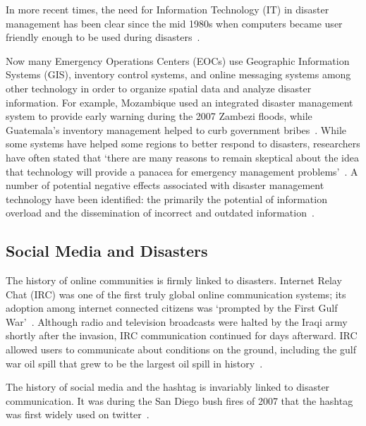 In more recent times, the need for Information Technology (IT) in disaster
management has been clear since the mid 1980s when computers became user
friendly enough to be used during
disasters~\cite{universityTerminalDisastersComputer1986}.

Now many Emergency Operations Centers (EOCs) use Geographic Information Systems
(GIS), inventory control systems, and online messaging systems among other
technology in order to organize spatial data and analyze disaster information.
For example, Mozambique used an integrated disaster management system to provide
early warning during the 2007  Zambezi floods, while Guatemala's inventory
management helped to curb government bribes~\cite{aminDataNaturalDisasters2008}.
While some systems have helped some regions to better respond to disasters,
researchers have often stated that `there are many reasons to remain skeptical
about the idea that technology will provide a panacea for emergency management
problems'~\cite{tzemosUseGISFederal1995, tierneyFacingUnexpectedDisaster2001,
perryNaturalDisasterManagement2007}. A number of potential negative effects
associated with disaster management technology have been identified: the
primarily the potential of information overload and the dissemination of
incorrect and outdated
information~\cite{quarantelliProblematicalAspectsInformation1997,
flentgeDesigningContextAwareHCI}.

\subsection{Social Media and Disasters}
The history of online communities is firmly linked to disasters. Internet
Relay Chat (IRC) was one of the first truly global online communication systems;
its adoption among internet connected citizens was `prompted by the First Gulf
War'~\cite{salazarHashtagsAnnotatedHistory2017}. Although radio and
television broadcasts were halted by the Iraqi army shortly after the invasion,
IRC communication continued for days afterward. IRC allowed users to communicate
about conditions on the ground, including the gulf war oil spill that grew to be
the largest oil spill in history~\cite{Timeline20Years2010}.

The history of social media and the hashtag is invariably linked to disaster
communication.  It was during the San Diego bush fires of 2007 that the hashtag
was first widely used on twitter~\cite{salazarHashtagsAnnotatedHistory2017}.

